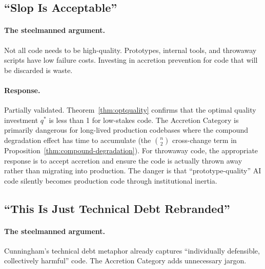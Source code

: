 \documentclass[11pt, a4paper, logo, copyright]{googledeepmind}
\begin{document}
\subsection{``Slop Is Acceptable''}

\paragraph{The steelmanned argument.} Not all code needs to be high-quality. Prototypes, internal tools, and throwaway scripts have low failure costs. Investing in accretion prevention for code that will be discarded is waste.

\paragraph{Response.} Partially validated. Theorem~\ref{thm:optquality} confirms that the optimal quality investment $q^*$ is less than 1 for low-stakes code. The Accretion Category is primarily dangerous for long-lived production codebases where the compound degradation effect has time to accumulate (the $\binom{n}{2}$ cross-change term in Proposition~\ref{thm:compound-degradation}). For throwaway code, the appropriate response is to accept accretion and ensure the code is actually thrown away rather than migrating into production. The danger is that ``prototype-quality'' AI code silently becomes production code through institutional inertia.

\subsection{``This Is Just Technical Debt Rebranded''}

\paragraph{The steelmanned argument.} Cunningham's technical debt metaphor already captures ``individually defensible, collectively harmful'' code. The Accretion Category adds unnecessary jargon.
\end{document}
